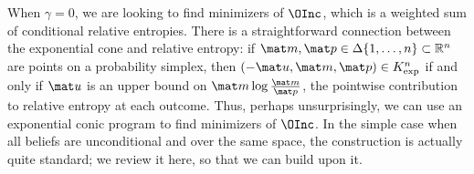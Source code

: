 When $\gamma = 0$, we are looking to find minimizers of $\OInc$,
which is a
weighted sum of conditional relative entropies.
There is a straightforward connection between the exponential cone and
relative entropy:
if $\mat m, \mat p \in
\Delta \{1, \ldots, n\}
\subset \mathbb R^n$ are points on
a probability simplex,
then $(-\mat u, \mat m, \mat p) \in K_{\exp}^n$ if and only if
$\mat u$ is an upper bound on $\mat m \log \frac{\mat m}{\mat p}$,
the pointwise contribution to relative entropy at each outcome.
Thus, perhaps unsurprisingly, we can use an exponential conic program to
find minimizers of $\OInc$.
In the simple case when all beliefs are unconditional and over the same space,
the construction is actually quite standard;
we review it here, so that we can build upon it.

